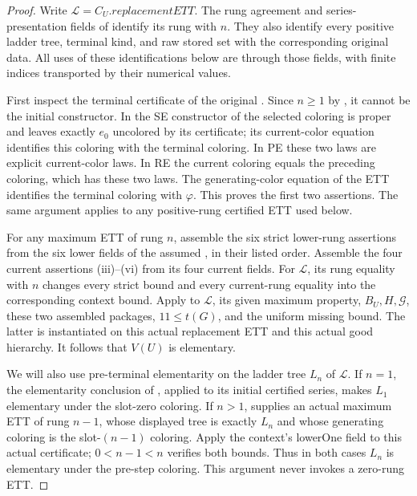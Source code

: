 \begin{proof}
Write $\mathcal L=C_U.\mathit{replacementETT}$.
The rung agreement and series-presentation fields of
 identify its rung with $n$.
They also identify every positive ladder tree, terminal kind, and raw
stored set with the corresponding original data. All uses of these
identifications below are through those fields, with finite indices
transported by their numerical values.

First inspect the terminal certificate of the original
. Since $n\ge1$ by
, it cannot be the initial constructor.
In the SE constructor of  the selected
coloring is proper and leaves exactly $e_0$ uncolored by its
 certificate; its current-color
equation identifies this coloring with the terminal coloring.
In PE these two laws are explicit current-color laws. In RE the current
coloring equals the preceding coloring, which has these two laws.
The generating-color equation of the ETT identifies the terminal
coloring with $\varphi$. This proves the first two assertions. The same
argument applies to any positive-rung certified ETT used below.

For any maximum ETT of rung $n$, assemble the six strict lower-rung
assertions from the six lower fields of the assumed
, in their listed order. Assemble
the four current assertions (iii)--(vi) from its four current fields.
For $\mathcal L$, its rung equality with $n$ changes every strict bound
and every current-rung equality into the corresponding context bound.
Apply  to $\mathcal L$, its
given maximum property, $B_U,H,\mathcal G$, these two assembled
packages, $11\le t(G)$, and the uniform missing bound. The latter is
instantiated on this actual replacement ETT and this actual good
hierarchy. It follows that $V(U)$ is elementary.

We will also use pre-terminal elementarity on the ladder tree $L_n$ of
$\mathcal L$. If $n=1$, the elementarity conclusion of
, applied to its initial certified
series, makes $L_1$ elementary under the slot-zero coloring.
If $n>1$,  supplies an actual maximum
ETT of rung $n-1$, whose displayed tree is exactly $L_n$ and whose
generating coloring is the slot-$(n-1)$ coloring. Apply the context's
lowerOne field to this actual certificate; $0<n-1<n$ verifies both
bounds. Thus in both cases $L_n$ is elementary under the pre-step
coloring. This argument never invokes a zero-rung ETT.


\end{proof}
